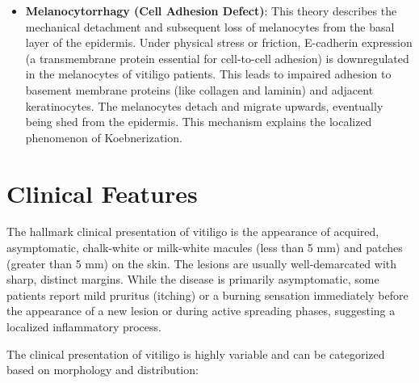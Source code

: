 \begin{itemize}
    \item \textbf{Melanocytorrhagy (Cell Adhesion Defect)}: This theory describes the mechanical detachment and subsequent loss of melanocytes from the basal layer of the epidermis. Under physical stress or friction, E-cadherin expression (a transmembrane protein essential for cell-to-cell adhesion) is downregulated in the melanocytes of vitiligo patients. This leads to impaired adhesion to basement membrane proteins (like collagen and laminin) and adjacent keratinocytes. The melanocytes detach and migrate upwards, eventually being shed from the epidermis. This mechanism explains the localized phenomenon of Koebnerization.
\end{itemize}

\section*{Clinical Features}
The hallmark clinical presentation of vitiligo is the appearance of acquired, asymptomatic, chalk-white or milk-white macules (less than 5 mm) and patches (greater than 5 mm) on the skin. The lesions are usually well-demarcated with sharp, distinct margins. While the disease is primarily asymptomatic, some patients report mild pruritus (itching) or a burning sensation immediately before the appearance of a new lesion or during active spreading phases, suggesting a localized inflammatory process.

The clinical presentation of vitiligo is highly variable and can be categorized based on morphology and distribution:

